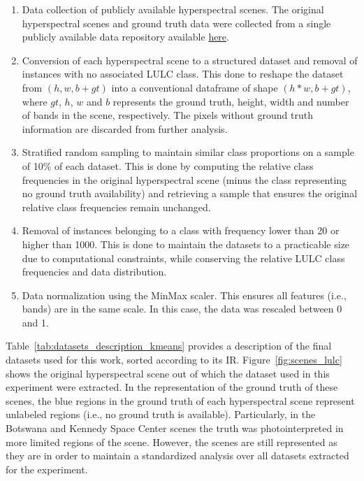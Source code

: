 \begin{enumerate}
    
    \item Data collection of publicly available hyperspectral scenes.
        The original hyperspectral scenes and ground truth data were collected
        from a single publicly available data repository available
        \href{http://www.ehu.eus/ccwintco/index.php?title=Hyperspectral_Remote_Sensing_Scenes}{here}.

    \item Conversion of each hyperspectral scene to a structured
        dataset and removal of instances with no associated LULC class. This
        done to reshape the dataset from $(h,w,b+gt)$  into a conventional
        dataframe of shape $(h*w,b+gt)$, where $gt$, $h$, $w$ and $b$
        represents the ground truth, height, width and number of bands in the
        scene, respectively. The pixels without ground truth information are
        discarded from further analysis.

    \item Stratified random sampling to maintain similar class
        proportions on a sample of 10\% of each dataset. This is done by
        computing the relative class frequencies in the original hyperspectral
        scene (minus the class representing no ground truth availability) and
        retrieving a sample that ensures the original relative class
        frequencies remain unchanged.

    \item Removal of instances belonging to a class with frequency
        lower than 20 or higher than 1000. This is done to maintain the
        datasets to a practicable size due to computational constraints, while
        conserving the relative LULC class frequencies and data distribution. 

    \item Data normalization using the MinMax scaler. This ensures all
        features (i.e., bands) are in the same scale. In this case, the data
        was rescaled between 0 and 1.

\end{enumerate}

Table~\ref{tab:datasets_description_kmeans} provides a description of the final
datasets used for this work, sorted according to its IR.
Figure~\ref{fig:scenes_lulc} shows the original hyperspectral scene out of which
the dataset used in this experiment were extracted. In the representation of
the ground truth of these scenes, the blue regions in the ground truth of each
hyperspectral scene represent unlabeled regions (i.e., no  ground truth is
available). Particularly, in the Botswana and Kennedy Space Center scenes the
truth was photointerpreted in more limited regions of the scene. However, the
scenes are still represented as they are in order to maintain a standardized
analysis over all datasets extracted for the experiment.

